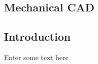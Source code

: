 
\vspace*{8.5cm}

\begin{flushright}
	\section{Mechanical CAD}
\end{flushright}

\subsection{Introduction}
	Enter some text here